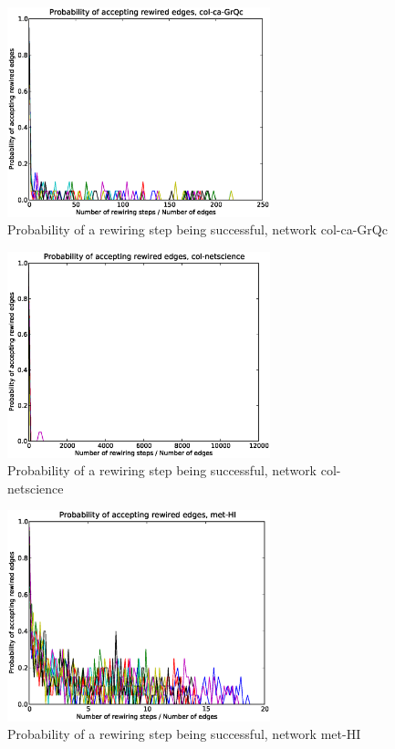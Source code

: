 \begin{figure}[p]
\centering
\includegraphics[width=3in]{Figures/Paccept-col-ca-GrQc.eps}
\caption{Probability of a rewiring step being successful, network col-ca-GrQc}
\label{fig:Paccept-col-ca-GrQc}
\end{figure}

\begin{figure}[p]
\centering
\includegraphics[width=3in]{Figures/Paccept-col-netscience.eps}
\caption{Probability of a rewiring step being successful, network col-netscience}
\label{fig:Paccept-col-netscience}
\end{figure}

\begin{figure}[p]
\centering
\includegraphics[width=3in]{Figures/Paccept-met-HI.eps}
\caption{Probability of a rewiring step being successful, network met-HI}
\label{fig:Paccept-met-HI}
\end{figure}

